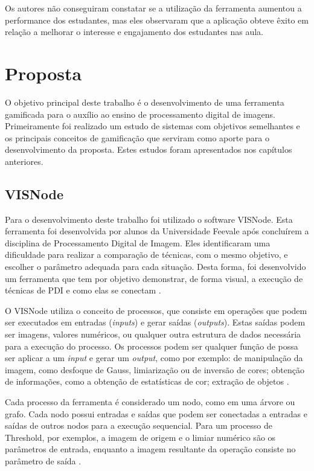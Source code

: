 \documentclass[
	12pt,				%
	oneside,			%
	a4paper,			%
	english,			%
	french,				%
	spanish,			%
	brazil,				%
	]{abntex2}
\begin{document}
Os autores não conseguiram constatar se a utilização da ferramenta aumentou a performance dos estudantes, mas eles observaram que a aplicação obteve êxito em relação a melhorar o interesse e engajamento dos estudantes nas aula.

\chapter{Proposta} 

O objetivo principal deste trabalho é o desenvolvimento de uma ferramenta gamificada para o auxílio ao ensino de processamento digital de imagens. Primeiramente foi realizado um estudo de sistemas com objetivos semelhantes e os principais conceitos de gamificação que serviram como aporte para o desenvolvimento da proposta. Estes estudos foram apresentados nos capítulos anteriores.
    
\section{VISNode}

Para o desenvolvimento deste trabalho foi utilizado o software VISNode. Esta ferramenta foi desenvolvida por alunos da Universidade Feevale após concluírem a disciplina de Processamento Digital de Imagem. Eles identificaram uma dificuldade para realizar a comparação de técnicas, com o mesmo objetivo, e escolher o parâmetro adequada para cada situação. Desta forma, foi desenvolvido um ferramenta que tem por objetivo demonstrar, de forma visual,  a execução de técnicas de PDI e como elas se conectam \cite{visnode}.

O VISNode utiliza o conceito de processos, que consiste em operações que podem ser executados em entradas (\textit{inputs}) e gerar saídas (\textit{outputs}). Estas saídas podem ser imagens, valores numéricos, ou qualquer outra estrutura de dados necessária para a execução do processo. Os processos podem ser qualquer função de possa ser aplicar a um \textit{input} e gerar um \textit{output}, como por exemplo: de manipulação da imagem, como desfoque de Gauss, limiarização ou de inversão de cores; obtenção de informações, como a obtenção de estatísticas de cor;  extração de objetos \cite{visnode}.

Cada processo da ferramenta é considerado um nodo, como em uma árvore ou grafo. Cada nodo possui entradas e saídas que podem ser conectadas a entradas e saídas de outros nodos para a execução sequencial. Para um processo de Threshold, por exemplos, a imagem de origem e o limiar numérico são os parâmetros de entrada, enquanto a imagem resultante da operação consiste no parâmetro de saída \cite{visnode}. 
\end{document}
